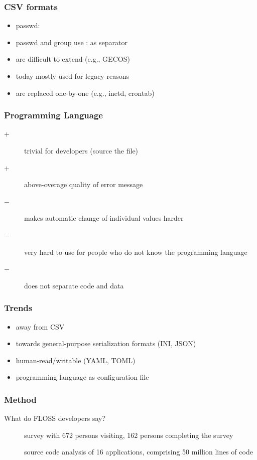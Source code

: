 \begin{frame}
	\frametitle{CSV formats}
	\begin{itemize}
	\item passwd: 
	\item passwd and group use : as separator
	\item are difficult to extend (e.g., GECOS)
	\item today mostly used for legacy reasons
	\item are replaced one-by-one (e.g., inetd, crontab)
	\end{itemize}
\end{frame}

\begin{frame}
	\frametitle{Programming Language}
	\begin{description}
	\item[$+$] trivial for developers (source the file)
	\item[$+$] above-overage quality of error message
	\item[$-$] makes automatic change of individual values harder
	\item[$-$] very hard to use for people who do not know the programming language
	\item[$-$] does not separate code and data
	\end{description}
\end{frame}

\begin{frame}
	\frametitle{Trends}
	\begin{itemize}
	\item away from CSV
	\item towards general-purpose serialization formats (INI, JSON)
	\item human-read/writable (YAML, TOML)
	\item programming language as configuration file
	\end{itemize}
\end{frame}

\begin{frame}
	\frametitle{Method}

	What do FLOSS developers say?

	\begin{description}
	\item[\methodQuestion{}] survey with 672 persons visiting, 162 persons completing the survey~\cite{raab2017challenges}
	\item[\methodSource{}] source code analysis of 16 applications, comprising 50 million lines of code~\cite{raab2017challenges}
	\end{description}
\end{frame}

